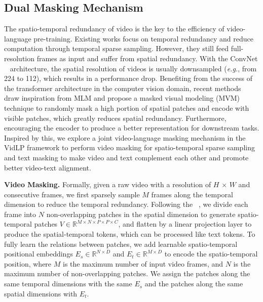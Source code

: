 \documentclass[10pt,twocolumn,letterpaper]{article}
\begin{document}
\vspace{-1mm}\subsection{Dual Masking Mechanism}\vspace{-1mm}
\label{sec:dual masking}
The spatio-temporal redundancy of video is the key to the efficiency of video-language pre-training. Existing works focus on temporal redundancy and reduce computation through temporal sparse sampling. However, they still feed full-resolution frames as input and suffer from spatial redundancy. With the ConvNet ~\cite{vgg, resnet} architecture, the spatial resolution of videos is usually downsampled (\emph{e.g.}, from 224 to 112), which results in a performance drop. Benefiting from the success of the transformer architecture in the computer vision domain, recent methods~\cite{mae, beit} draw inspiration from MLM and propose a masked visual modeling (MVM) technique to randomly mask a high portion of spatial patches and encode with visible patches, which greatly reduces spatial redundancy. Furthermore, encouraging the encoder to produce a better representation for downstream tasks. Inspired by this, we explore a joint video-language masking mechanism in the VidLP framework to perform video masking for spatio-temporal sparse sampling and text masking to make video and text complement each other and promote better video-text alignment.

\vspace{1mm}\noindent\textbf{Video Masking.} Formally, given a raw video with a resolution of $H$ $\times$ $W$ and consecutive frames, we first sparsely sample $M$ frames along the temporal dimension to reduce the temporal redundancy. Following the ~\cite{vit}, we divide each frame into $N$ non-overlapping patches in the spatial dimension to generate spatio-temporal patches $V \in \mathbb{R}^{M \times N \times P \times P \times C}$, and flatten by a linear projection layer to produce the spatial-temporal tokens, which can be processed like text tokens. To fully learn the relations between patches, we add learnable spatio-temporal positional embeddings $E_s \in \mathbb{R}^{N \times D} $ and $E_t \in \mathbb{R}^{M \times D}$ to encode the spatio-temporal position, where $M$ is the maximum number of input video frames, and $N$ is the maximum number of non-overlapping patches. We assign the patches along the same temporal dimensions with the same $E_s$ and the patches along the same spatial dimensions with $E_t$. 
\end{document}
